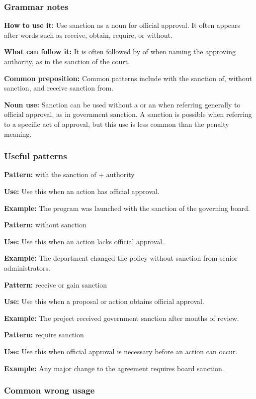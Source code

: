 \documentclass[11pt]{article}
\begin{document}
\subsubsection{Grammar notes}
\textbf{How to use it:} Use sanction as a noun for official approval. It often appears after words such as receive, obtain, require, or without.

\textbf{What can follow it:} It is often followed by of when naming the approving authority, as in the sanction of the court.

\textbf{Common preposition:} Common patterns include with the sanction of, without sanction, and receive sanction from.

\textbf{Noun use:} Sanction can be used without a or an when referring generally to official approval, as in government sanction. A sanction is possible when referring to a specific act of approval, but this use is less common than the penalty meaning.

\subsubsection{Useful patterns}
\textbf{Pattern:} with the sanction of + authority

\textbf{Use:} Use this when an action has official approval.

\textbf{Example:} The program was launched with the sanction of the governing board.

\textbf{Pattern:} without sanction

\textbf{Use:} Use this when an action lacks official approval.

\textbf{Example:} The department changed the policy without sanction from senior administrators.

\textbf{Pattern:} receive or gain sanction

\textbf{Use:} Use this when a proposal or action obtains official approval.

\textbf{Example:} The project received government sanction after months of review.

\textbf{Pattern:} require sanction

\textbf{Use:} Use this when official approval is necessary before an action can occur.

\textbf{Example:} Any major change to the agreement requires board sanction.

\subsubsection{Common wrong usage}
\end{document}
